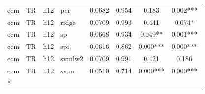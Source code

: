 \begin{ThreePartTable}
\begin{longtable}[t]{llclcccc}
ecm & TR & h12 & pcr & 0.0682 & 0.954 & 0.183 & 0.002***\\
ecm & TR & h12 & ridge & 0.0709 & 0.993 & 0.441 & 0.074*\\
ecm & TR & h12 & sp & 0.0668 & 0.934 & 0.049** & 0.001***\\
ecm & TR & h12 & spi & 0.0616 & 0.862 & 0.000*** & 0.000***\\
ecm & TR & h12 & svmlw2 & 0.0709 & 0.991 & 0.421 & 0.186\\
ecm & TR & h12 & svmr & 0.0510 & 0.714 & 0.000*** & 0.000***\\*
\end{longtable}
\end{ThreePartTable}
\endgroup{}
